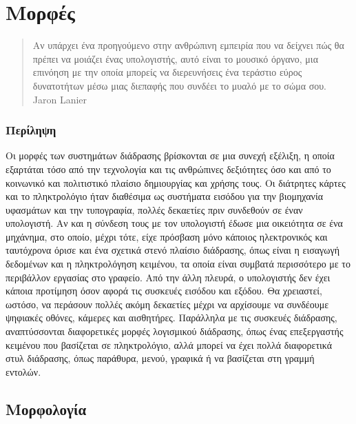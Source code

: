 \documentclass[
]{article}
\begin{document}
\hypertarget{ux3bcux3bfux3c1ux3c6ux3adux3c2}{%
\section{Μορφές}\label{ux3bcux3bfux3c1ux3c6ux3adux3c2}}

\begin{quote}
Αν υπάρχει ένα προηγούμενο στην ανθρώπινη εμπειρία που να δείχνει πώς θα
πρέπει να μοιάζει ένας υπολογιστής, αυτό είναι το μουσικό όργανο, μια
επινόηση με την οποία μπορείς να διερευνήσεις ένα τεράστιο εύρος
δυνατοτήτων μέσω μιας διεπαφής που συνδέει το μυαλό με το σώμα σου.
Jaron Lanier
\end{quote}

\hypertarget{ux3c0ux3b5ux3c1ux3afux3bbux3b7ux3c8ux3b7}{%
\subsubsection{Περίληψη}\label{ux3c0ux3b5ux3c1ux3afux3bbux3b7ux3c8ux3b7}}

Οι μορφές των συστημάτων διάδρασης βρίσκονται σε μια συνεχή εξέλιξη, η
οποία εξαρτάται τόσο από την τεχνολογία και τις ανθρώπινες δεξιότητες
όσο και από το κοινωνικό και πολιτιστικό πλαίσιο δημιουργίας και χρήσης
τους. Οι διάτρητες κάρτες και το πληκτρολόγιο ήταν διαθέσιμα ως
συστήματα εισόδου για την βιομηχανία υφασμάτων και την τυπογραφία,
πολλές δεκαετίες πριν συνδεθούν σε έναν υπολογιστή. Αν και η σύνδεση
τους με τον υπολογιστή έδωσε μια οικειότητα σε ένα μηχάνημα, στο οποίο,
μέχρι τότε, είχε πρόσβαση μόνο κάποιος ηλεκτρονικός και ταυτόχρονα όρισε
και ένα σχετικά στενό πλαίσιο διάδρασης, όπως είναι η εισαγωγή δεδομένων
και η πληκτρολόγηση κειμένου, τα οποία είναι συμβατά περισσότερο με το
περιβάλλον εργασίας στο γραφείο. Από την άλλη πλευρά, ο υπολογιστής δεν
έχει κάποια προτίμηση όσον αφορά τις συσκευές εισόδου και εξόδου. Θα
χρειαστεί, ωστόσο, να περάσουν πολλές ακόμη δεκαετίες μέχρι να αρχίσουμε
να συνδέουμε ψηφιακές οθόνες, κάμερες και αισθητήρες. Παράλληλα με τις
συσκευές διάδρασης, αναπτύσσονται διαφορετικές μορφές λογισμικού
διάδρασης, όπως ένας επεξεργαστής κειμένου που βασίζεται σε
πληκτρολόγιο, αλλά μπορεί να έχει πολλά διαφορετικά στυλ διάδρασης, όπως
παράθυρα, μενού, γραφικά ή να βασίζεται στη γραμμή εντολών.

\hypertarget{ux3bcux3bfux3c1ux3c6ux3bfux3bbux3bfux3b3ux3afux3b1}{%
\subsection{Μορφολογία}\label{ux3bcux3bfux3c1ux3c6ux3bfux3bbux3bfux3b3ux3afux3b1}}
\end{document}
